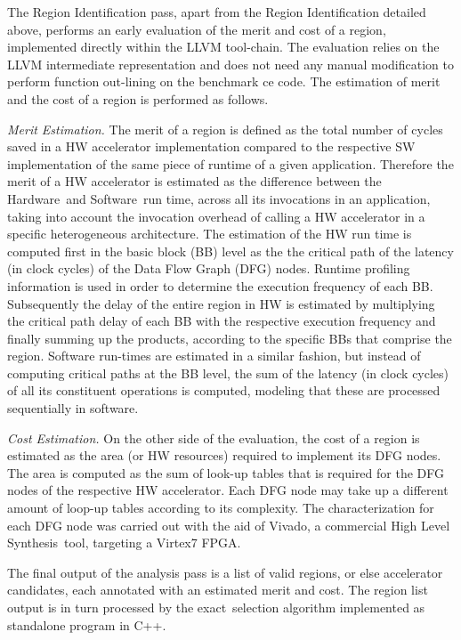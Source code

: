 \documentclass[]{usiinfthesis}
\newcommand{\HW}{{Hardware}}
\newcommand{\SW}{{Software}}
\newcommand{\HLS}{{High Level Synthesis}}
\newcommand{\exact}{\textsf{exact}}
\begin{document}
The Region Identification pass, apart from the Region Identification detailed above, 
performs an early evaluation of the merit and cost of a region, implemented
directly within the LLVM tool-chain. The evaluation relies on the LLVM intermediate
representation and does not need any manual modification to perform function out-lining
on the benchmark ce code. 
The estimation of merit and the cost of a region is performed as follows.\par

\emph{Merit Estimation.} 
The merit of a region is defined as the total number of cycles saved in a HW accelerator 
implementation compared to the respective SW implementation of the same piece of runtime 
of a given application. Therefore the merit of a HW accelerator is estimated as the 
difference between the \HW\ and \SW\ run time, across all its invocations in an application,
taking into account the invocation overhead of calling a HW accelerator in a specific 
heterogeneous architecture. The estimation of the HW run time is computed first in the 
basic block (BB) level as the the critical path of the latency (in clock cycles) of the Data 
Flow Graph (DFG) nodes. Runtime profiling information is used in order to determine the execution 
frequency of each BB.
Subsequently the delay of the entire region in HW is estimated by multiplying the critical path
delay of each BB with the respective execution frequency and finally summing up the products, 
according to the specific BBs that comprise the region.
Software run-times are estimated in a similar fashion, but instead of computing critical paths 
at the BB level, the sum of the latency (in clock cycles) of all its constituent operations is 
computed, modeling that these are processed sequentially in software.\par

\emph{Cost Estimation.} On the other side of the evaluation, the cost of a region 
is estimated as the area (or HW resources) required to implement its DFG nodes. The area 
is computed as the sum of look-up tables that is required for
the DFG nodes of the respective HW accelerator. Each DFG node may take up a different amount
of loop-up tables according to its complexity. The characterization for each DFG node was carried
out with the aid of Vivado, a commercial \HLS\ tool, targeting a Virtex7 FPGA.\par
The final output of the analysis pass is a list of valid regions, 
or else accelerator candidates, each annotated with an estimated merit and cost.
The region list output is in turn processed by the 
\exact\ selection algorithm implemented as standalone program in C++.
\end{document}
